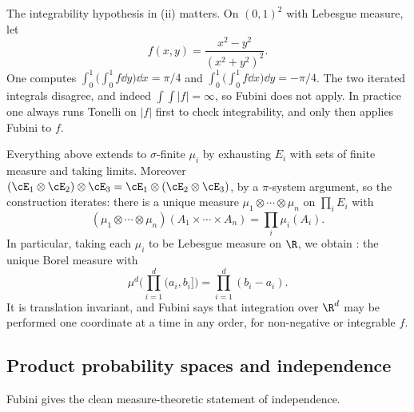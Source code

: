 \begin{remark}
	The integrability hypothesis in (ii) matters. On $(0,1)^2$ with Lebesgue measure, let
	$$
	f(x,y) = \frac{x^2-y^2}{(x^2+y^2)^2}.
	$$
	One computes $\int_0^1\big(\int_0^1 f\dd y\big)\dd x = \pi/4$ and $\int_0^1\big(\int_0^1 f\dd x\big)\dd y = -\pi/4$. The two iterated integrals disagree, and indeed $\int\int|f| = \infty$, so Fubini does not apply. In practice one always runs Tonelli on $|f|$ first to check integrability, and only then applies Fubini to $f$.
\end{remark}

\begin{remark}
	Everything above extends to $\sigma$-finite $\mu_i$ by exhausting $E_i$ with sets of finite measure and taking limits. Moreover $(\cE_1\otimes\cE_2)\otimes\cE_3 = \cE_1\otimes(\cE_2\otimes\cE_3)$, by a $\pi$-system argument, so the construction iterates: there is a unique measure $\mu_1\otimes\cdots\otimes\mu_n$ on $\prod_i E_i$ with
	$$
	(\mu_1\otimes\cdots\otimes\mu_n)(A_1\times\cdots\times A_n)=\prod_i \mu_i(A_i).
	$$
	In particular, taking each $\mu_i$ to be Lebesgue measure on $\R$, we obtain : the unique Borel measure with
	$$
	\mu^d\Big(\prod_{i=1}^d (a_i,b_i]\Big) = \prod_{i=1}^d (b_i-a_i).
	$$
	It is translation invariant, and Fubini says that integration over $\R^d$ may be performed one coordinate at a time in any order, for non-negative or integrable $f$.
\end{remark}

\subsection{Product probability spaces and independence}

Fubini gives the clean measure-theoretic statement of independence.

